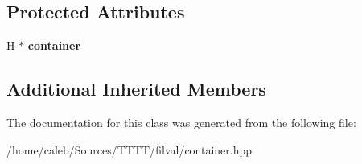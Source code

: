 \subsection*{Protected Attributes}
\begin{DoxyCompactItemize}
\item 
\hypertarget{classfv_1_1Container_aa5e74e62f69e756cad950fdc94e9a8c0}{}\label{classfv_1_1Container_aa5e74e62f69e756cad950fdc94e9a8c0} 
H $\ast$ {\bfseries container}
\end{DoxyCompactItemize}
\subsection*{Additional Inherited Members}


The documentation for this class was generated from the following file\+:\begin{DoxyCompactItemize}
\item 
/home/caleb/\+Sources/\+T\+T\+T\+T/filval/container.\+hpp\end{DoxyCompactItemize}
